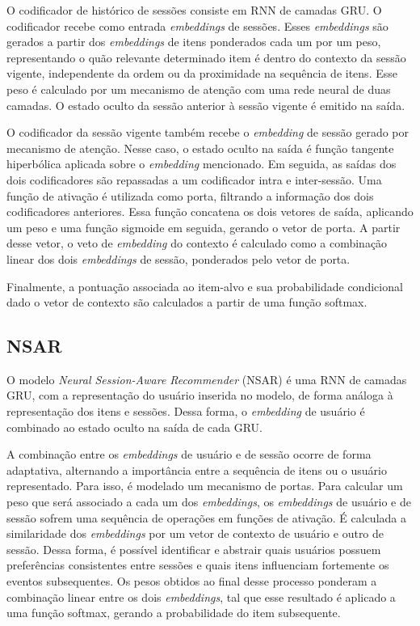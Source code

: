 O codificador de histórico de sessões consiste em RNN de camadas GRU. O
codificador recebe como entrada \textit{embeddings} de sessões. Esses
\textit{embeddings} são gerados a partir dos \textit{embeddings} de itens
ponderados cada um por um peso, representando o quão relevante determinado item
é dentro do contexto da sessão vigente, independente da ordem ou da proximidade
na sequência de itens. Esse peso é calculado por um mecanismo de atenção com uma
rede neural de duas camadas. O estado oculto da sessão anterior à sessão vigente
é emitido na saída.

O codificador da sessão vigente também recebe o \textit{embedding} de sessão
gerado por mecanismo de atenção. Nesse caso, o estado oculto na saída é função
tangente hiperbólica aplicada sobre o \textit{embedding} mencionado. Em seguida,
as saídas dos dois codificadores são repassadas a um codificador intra e
inter-sessão. Uma função de ativação é utilizada como porta, filtrando a
informação dos dois codificadores anteriores. Essa função concatena os dois
vetores de saída, aplicando um peso e uma função sigmoide em seguida, gerando o
vetor de porta. A partir desse vetor, o veto de \textit{embedding} do contexto
é calculado como a combinação linear dos dois \textit{embeddings} de sessão,
ponderados pelo vetor de porta.

Finalmente, a pontuação associada ao item-alvo e sua probabilidade condicional
dado o vetor de contexto são calculados a partir de uma função softmax.
  
\subsection{NSAR}
O modelo \textit{Neural Session-Aware Recommender} (NSAR) é uma RNN de camadas GRU,
com a representação do usuário inserida no modelo, de forma análoga à
representação dos itens e sessões. Dessa forma, o \textit{embedding} de usuário
é combinado ao estado oculto na saída de cada GRU.

A combinação entre os \textit{embeddings} de usuário e de sessão ocorre de forma
adaptativa, alternando a importância entre a sequência de itens ou o usuário
representado. Para isso, é modelado um mecanismo de portas. Para calcular um
peso que será associado a cada um dos \textit{embeddings}, os
\textit{embeddings} de usuário e de sessão sofrem uma sequência de operações em
funções de ativação. É calculada a similaridade dos \textit{embeddings} por um
vetor de contexto de usuário e outro de sessão. Dessa forma, é possível
identificar e abstrair quais usuários possuem preferências consistentes entre
sessões e quais itens influenciam fortemente os eventos subsequentes. Os pesos
obtidos ao final desse processo ponderam a combinação linear entre os dois
\textit{embeddings}, tal que esse resultado é aplicado a uma função softmax,
gerando a probabilidade do item subsequente.

